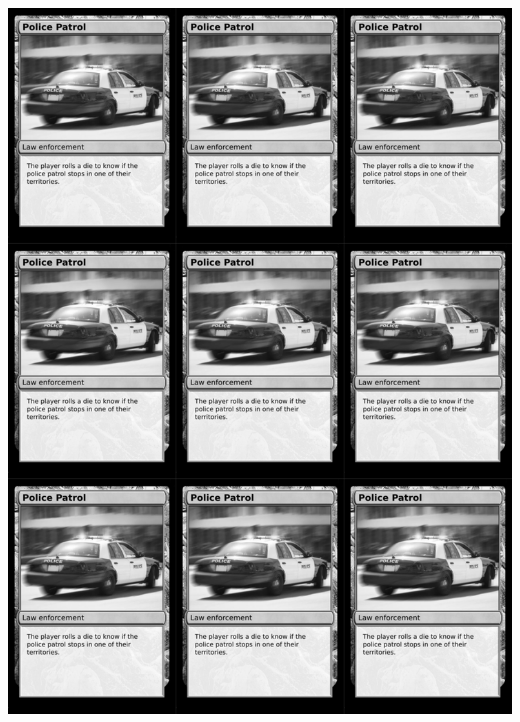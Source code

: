 \documentclass[a4paper]{article}
\begin{document}
\newpage

\begin{center}
	\centering
	\includegraphics[width=200.5mm,height=280.7mm]{output/temp/page31.png}
\end{center}
\end{document}
